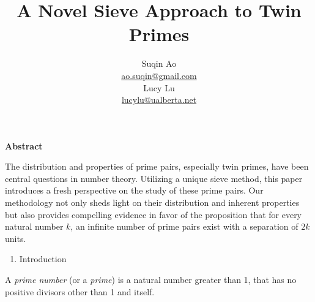 \documentclass{article}
\begin{document}
\title{\textbf{A Novel Sieve Approach to Twin Primes}
\vspace{2\baselineskip}}
\date{} %


\author{%
    \begin{minipage}{0.5\textwidth}
        \centering
        Suqin Ao \\
        \href{mailto:ao.suqin@gmail.com}{ao.suqin@gmail.com}
    \end{minipage}%
    \hfill
    \begin{minipage}{0.5\textwidth}
        \centering
        Lucy Lu \\
        \href{mailto:lucylu@ualberta.net}{lucylu@ualberta.net}
    \end{minipage}
}

\maketitle

\vspace{6\baselineskip}


\begin{center}
\textbf{Abstract}
\vspace{2\baselineskip}

\noindent
\begin{minipage}{0.7\textwidth}
The distribution and properties of prime pairs, especially twin primes, have been central questions in number theory. Utilizing a unique sieve method, this paper introduces a fresh perspective on the study of these prime pairs. Our methodology not only sheds light on their distribution and inherent properties but also provides compelling evidence in favor of the proposition that for every natural number \( k \), an infinite number of prime pairs exist with a separation of \( 2k \) units.

\end{minipage}
\end{center}

\newpage

\begin{enumerate}
	\item \begin{center}
Introduction
\end{center}


\end{enumerate}
\vspace{1\baselineskip}

A \textit{prime number} (or a \textit{prime}) is a natural number greater than 1, that has no positive divisors other than 1 and itself.  
\vspace{1\baselineskip}
\end{document}
